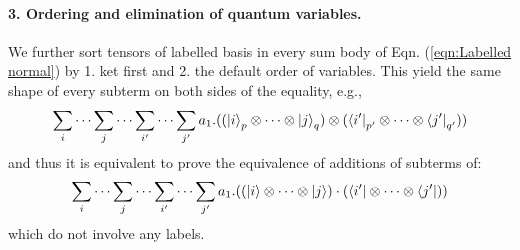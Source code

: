 \paragraph*{3. Ordering and elimination of quantum variables.} 
We further sort tensors of labelled basis in every sum body of Eqn. (\ref{eqn:Labelled normal}) by 1. ket first and 2. the default order of variables. This yield the same shape of every subterm on both sides of the equality, e.g., 
\begin{equation}
  \label{eqn:Labelled normal1}
  \sum_{i}\cdots\sum_{j}\cdots \sum_{i'}\cdots\sum_{j'} a_1 . ((\ket{i}_p \otimes \cdots \otimes \ket{j}_q) \otimes (\bra{i'}_{p'}\otimes\cdots\otimes \bra{j'}_{q'}))
\end{equation}
and thus it is equivalent to prove the equivalence of additions of subterms of:
\begin{equation}
  \label{eqn:Labelled normal2}
  \sum_{i}\cdots\sum_{j}\cdots \sum_{i'}\cdots\sum_{j'} a_1 . ((\ket{i} \otimes \cdots \otimes \ket{j}) \cdot (\bra{i'}\otimes\cdots\otimes \bra{j'}))
\end{equation}
which do not involve any labels. 

\paragraph*{}

